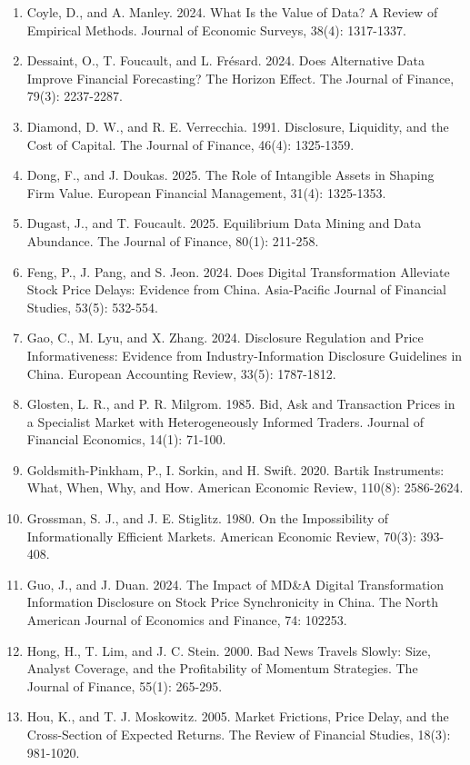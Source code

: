 \begin{enumerate}
\item
  Coyle, D., and A. Manley. 2024. What Is the Value of Data? A Review of Empirical Methods. Journal of Economic Surveys, 38(4): 1317-1337.
\item
  Dessaint, O., T. Foucault, and L. Frésard. 2024. Does Alternative Data Improve Financial Forecasting? The Horizon Effect. The Journal of Finance, 79(3): 2237-2287.
\item
  Diamond, D. W., and R. E. Verrecchia. 1991. Disclosure, Liquidity, and the Cost of Capital. The Journal of Finance, 46(4): 1325-1359.
\item
  Dong, F., and J. Doukas. 2025. The Role of Intangible Assets in Shaping Firm Value. European Financial Management, 31(4): 1325-1353.
\item
  Dugast, J., and T. Foucault. 2025. Equilibrium Data Mining and Data Abundance. The Journal of Finance, 80(1): 211-258.
\item
  Feng, P., J. Pang, and S. Jeon. 2024. Does Digital Transformation Alleviate Stock Price Delays: Evidence from China. Asia-Pacific Journal of Financial Studies, 53(5): 532-554.
\item
  Gao, C., M. Lyu, and X. Zhang. 2024. Disclosure Regulation and Price Informativeness: Evidence from Industry-Information Disclosure Guidelines in China. European Accounting Review, 33(5): 1787-1812.
\item
  Glosten, L. R., and P. R. Milgrom. 1985. Bid, Ask and Transaction Prices in a Specialist Market with Heterogeneously Informed Traders. Journal of Financial Economics, 14(1): 71-100.
\item
  Goldsmith-Pinkham, P., I. Sorkin, and H. Swift. 2020. Bartik Instruments: What, When, Why, and How. American Economic Review, 110(8): 2586-2624.
\item
  Grossman, S. J., and J. E. Stiglitz. 1980. On the Impossibility of Informationally Efficient Markets. American Economic Review, 70(3): 393-408.
\item
  Guo, J., and J. Duan. 2024. The Impact of MD\&A Digital Transformation Information Disclosure on Stock Price Synchronicity in China. The North American Journal of Economics and Finance, 74: 102253.
\item
  Hong, H., T. Lim, and J. C. Stein. 2000. Bad News Travels Slowly: Size, Analyst Coverage, and the Profitability of Momentum Strategies. The Journal of Finance, 55(1): 265-295.
\item
  Hou, K., and T. J. Moskowitz. 2005. Market Frictions, Price Delay, and the Cross-Section of Expected Returns. The Review of Financial Studies, 18(3): 981-1020.

\end{enumerate}
